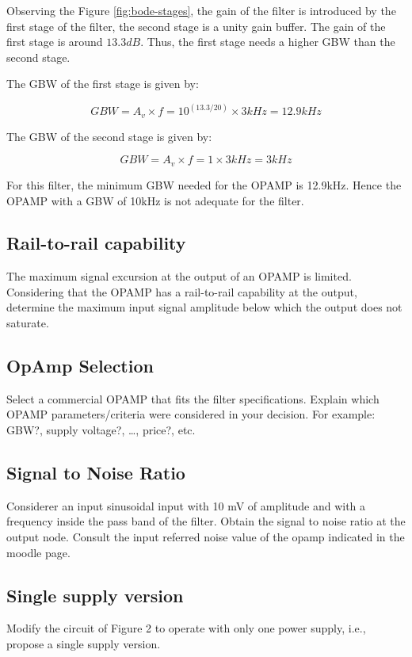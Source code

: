 Observing the Figure \ref{fig:bode-stages}, the gain of the filter is introduced by the first stage of the filter, the second stage is a unity gain buffer. The gain of the first stage is around $13.3dB$. Thus, the first stage needs a higher GBW than the second stage. 

The GBW of the first stage is given by:

\begin{equation}
    GBW = A_v \times f = 10^{(13.3/20)} \times 3kHz = 12.9kHz
\end{equation}

The GBW of the second stage is given by:

\begin{equation}
    GBW = A_v \times f = 1 \times 3kHz = 3kHz
\end{equation}

For this filter, the minimum GBW needed for the OPAMP is 12.9kHz. Hence the OPAMP with a GBW of 10kHz is not adequate for the filter.

\subsection{Rail-to-rail capability}
The maximum signal excursion at the output of an OPAMP is limited. Considering that the
OPAMP has a rail-to-rail capability at the output, determine the maximum input signal
amplitude below which the output does not saturate.

\subsection{OpAmp Selection}
Select a commercial OPAMP that fits the filter specifications. Explain which OPAMP
parameters/criteria were considered in your decision. For example: GBW?, supply voltage?, …,
price?, etc.

\subsection{Signal to Noise Ratio}
Considerer an input sinusoidal input with 10 mV of amplitude and with a frequency inside the
pass band of the filter. Obtain the signal to noise ratio at the output node. Consult the input
referred noise value of the opamp indicated in the moodle page.

\subsection{Single supply version}
Modify the circuit of Figure 2 to operate with only one power supply, i.e., propose a single supply version.
